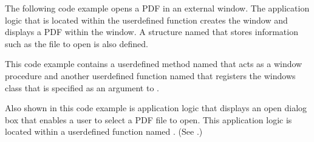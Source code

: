 \documentclass[letterpaper,12pt,english,openany,oneside]{sphinxmanual}
\begin{document}
The following code example opens a PDF in an external window. The application logic that is located within the  user\sphinxhyphen{}defined function creates the window and displays a PDF within the window. A structure named  that stores information such as the file to open is also defined.

This code example contains a user\sphinxhyphen{}defined method named  that acts as a window procedure and another user\sphinxhyphen{}defined function named  that registers the windows class that is specified as an argument to .

Also shown in this code example is application logic that displays an open dialog box that enables a user to select a PDF file to open. This application logic is located within a user\sphinxhyphen{}defined function named . (See .)
\end{document}

